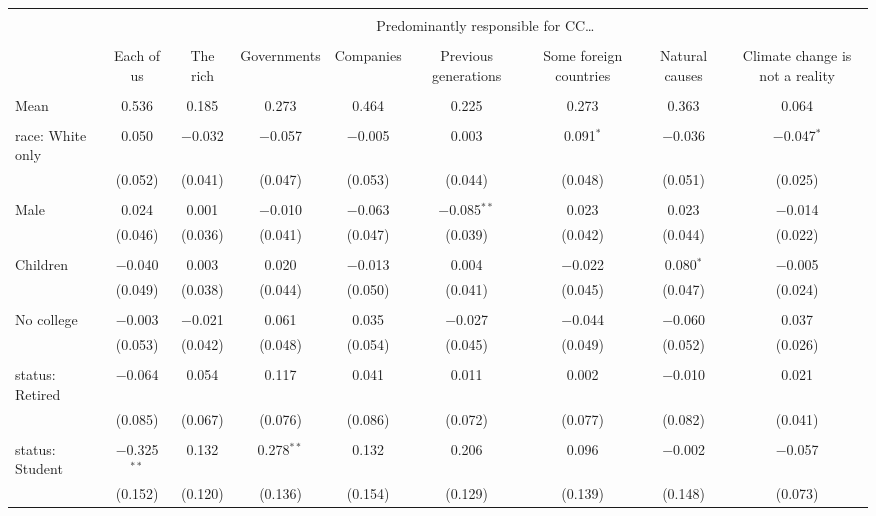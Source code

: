 
\begin{tabular}{@{\extracolsep{5pt}}lcccccccc} 
\\[-1.8ex]\hline 
\hline \\[-1.8ex] 
 & \multicolumn{8}{c}{Predominantly responsible for CC…} \\ 
\cline{2-9} 
\\[-1.8ex] & Each of us & The rich & Governments & Companies & Previous generations & Some foreign countries & Natural causes & Climate change is not a reality \\ 
\hline \\[-1.8ex] 
 Mean & 0.536 & 0.185 & 0.273 & 0.464 & 0.225 & 0.273 & 0.363 & 0.064  \\ \hline \\[-1.8ex] race: White only & 0.050 & $-$0.032 & $-$0.057 & $-$0.005 & 0.003 & 0.091$^{*}$ & $-$0.036 & $-$0.047$^{*}$ \\ 
  & (0.052) & (0.041) & (0.047) & (0.053) & (0.044) & (0.048) & (0.051) & (0.025) \\ 
  & & & & & & & & \\ 
 Male & 0.024 & 0.001 & $-$0.010 & $-$0.063 & $-$0.085$^{**}$ & 0.023 & 0.023 & $-$0.014 \\ 
  & (0.046) & (0.036) & (0.041) & (0.047) & (0.039) & (0.042) & (0.044) & (0.022) \\ 
  & & & & & & & & \\ 
 Children & $-$0.040 & 0.003 & 0.020 & $-$0.013 & 0.004 & $-$0.022 & 0.080$^{*}$ & $-$0.005 \\ 
  & (0.049) & (0.038) & (0.044) & (0.050) & (0.041) & (0.045) & (0.047) & (0.024) \\ 
  & & & & & & & & \\ 
 No college & $-$0.003 & $-$0.021 & 0.061 & 0.035 & $-$0.027 & $-$0.044 & $-$0.060 & 0.037 \\ 
  & (0.053) & (0.042) & (0.048) & (0.054) & (0.045) & (0.049) & (0.052) & (0.026) \\ 
  & & & & & & & & \\ 
 status: Retired & $-$0.064 & 0.054 & 0.117 & 0.041 & 0.011 & 0.002 & $-$0.010 & 0.021 \\ 
  & (0.085) & (0.067) & (0.076) & (0.086) & (0.072) & (0.077) & (0.082) & (0.041) \\ 
  & & & & & & & & \\ 
 status: Student & $-$0.325$^{**}$ & 0.132 & 0.278$^{**}$ & 0.132 & 0.206 & 0.096 & $-$0.002 & $-$0.057 \\ 
  & (0.152) & (0.120) & (0.136) & (0.154) & (0.129) & (0.139) & (0.148) & (0.073) \\ 

\end{tabular}
